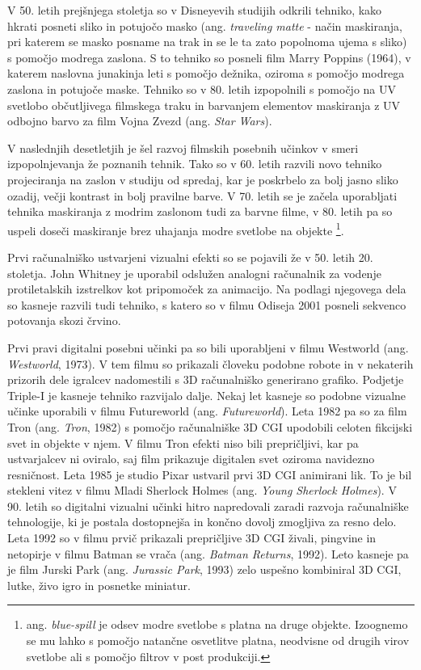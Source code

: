 \documentclass[a4paper, 12pt]{book}
\begin{document}
V 50. letih prejšnjega stoletja so v Disneyevih studijih odkrili tehniko, kako hkrati posneti sliko in potujočo masko (ang. {\it traveling matte} - način maskiranja, pri katerem se masko posname na trak in se le ta zato popolnoma ujema s sliko) s pomočjo modrega zaslona. 
S to tehniko so posneli film Marry Poppins (1964), v katerem naslovna junakinja leti s pomočjo dežnika, oziroma s pomočjo modrega zaslona in potujoče maske\cite{vesHandbook}.
Tehniko so v 80. letih izpopolnili s pomočjo na UV svetlobo občutljivega filmskega traku in barvanjem elementov maskiranja z UV odbojno barvo za film Vojna Zvezd (ang. {\it Star Wars}). 

V naslednjih desetletjih je šel razvoj filmskih posebnih učinkov v smeri izpopolnjevanja že poznanih tehnik. 
Tako so v 60. letih razvili novo tehniko projeciranja na zaslon v studiju od spredaj, kar je poskrbelo za bolj jasno sliko ozadij, večji kontrast in bolj pravilne barve. 
V 70. letih se je začela uporabljati tehnika maskiranja z modrim zaslonom tudi za barvne filme, v 80. letih pa so uspeli doseči maskiranje brez uhajanja modre svetlobe na objekte
\footnote{ang. {\it blue-spill} je odsev modre svetlobe s platna na druge objekte. 
Izoognemo se mu lahko s pomočjo natančne osvetlitve platna, neodvisne od drugih virov svetlobe ali s pomočjo filtrov v post produkciji.}.

Prvi računalniško ustvarjeni vizualni efekti so se pojavili že v 50. letih 20. stoletja. 
John Whitney je uporabil odslužen analogni računalnik za vodenje protiletalskih izstrelkov kot pripomoček za animacijo. 
Na podlagi njegovega dela so kasneje razvili tudi tehniko, s katero so v filmu Odiseja 2001 posneli sekvenco potovanja skozi črvino.

Prvi pravi digitalni posebni učinki pa so bili uporabljeni v filmu Westworld (ang. {\it Westworld}, 1973). %
V tem filmu so prikazali človeku podobne robote in v nekaterih prizorih dele igralcev nadomestili s 3D računalniško generirano grafiko. 
Podjetje Triple-I je kasneje tehniko razvijalo dalje.
Nekaj let kasneje so podobne vizualne učinke uporabili v filmu Futureworld (ang. {\it Futureworld}).
Leta 1982 pa so za film Tron (ang. {\it Tron}, 1982) s pomočjo računalniške 3D CGI upodobili celoten fikcijski svet in objekte v njem.
V filmu Tron efekti niso bili prepričljivi, kar pa ustvarjalcev ni oviralo, saj film prikazuje digitalen svet oziroma navidezno resničnost.
Leta 1985 je studio Pixar ustvaril prvi 3D CGI animirani lik.
To je bil stekleni vitez v filmu Mladi Sherlock Holmes (ang. {\it Young Sherlock Holmes}).
V 90. letih so digitalni vizualni učinki hitro napredovali zaradi razvoja računalniške tehnologije, ki je postala dostopnejša in končno dovolj zmogljiva za resno delo.
Leta 1992 so v filmu prvič prikazali prepričljive 3D CGI živali, pingvine in netopirje v filmu Batman se vrača (ang. {\it Batman Returns}, 1992).
Leto kasneje pa je film Jurski Park (ang. {\it Jurassic Park}, 1993) zelo uspešno kombiniral 3D CGI, lutke, živo igro in posnetke miniatur. 
\end{document}
